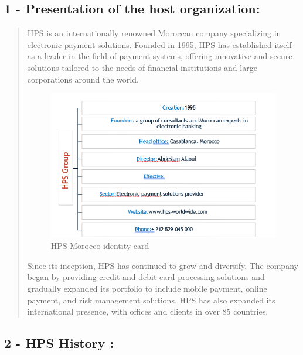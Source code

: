 \documentclass[12pt,a4paper]{report}
\begin{document}
\subsection{1 - Presentation of the host organization:}
\begin{quote}
HPS is an internationally renowned Moroccan company specializing in electronic payment solutions. Founded in 1995, HPS has established itself as a leader in the field of payment systems, offering innovative and secure solutions tailored to the needs of financial institutions and large corporations around the world.

\begin{figure}[H]
\centering
\includegraphics[width=5.41667in]{media/infosHPS.png}
\caption{HPS Morocco identity card}
\label{fig:infosHPS}
\end{figure}

Since its inception, HPS has continued to grow and diversify. The company began by providing credit and debit card processing solutions and gradually expanded its portfolio to include mobile payment, online payment, and risk management solutions. HPS has also expanded its international presence, with offices and clients in over 85 countries.
\end{quote}

\subsection{2 - HPS History :}
\end{document}
